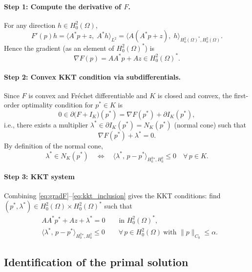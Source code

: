 \documentclass[11pt,a4paper]{article}
\begin{document}
\paragraph{Step 1: Compute the derivative of $F$.} 
For any direction $h\in H^2_0(\Omega)$,
\[
F'(p)h
=\langle A^*p+z,\;A^*h\rangle_{L^2}
=\langle A(A^*p+z),\;h\rangle_{H^2_0(\Omega)^*,H^2_0(\Omega)}.
\]
Hence the gradient (as an element of $H^2_0(\Omega)^*$) is
\begin{equation}\label{eq:gradF}
\nabla F(p)=AA^*p+Az \in H^2_0(\Omega)^*.
\end{equation}

\paragraph{Step 2: Convex KKT condition via subdifferentials.}
Since $F$ is convex and Fr\'echet differentiable and $K$ is closed and convex, the
first-order optimality condition for $p^*\in K$ is
\[
0\in \partial \bigl(F+I_K\bigr)(p^*)
=\nabla F(p^*)+\partial I_K(p^*),
\]
i.e., there exists a multiplier $\lambda^*\in \partial I_K(p^*)=N_K(p^*)$ (normal cone) such that
\begin{equation}\label{eq:kkt_inclusion}
\nabla F(p^*)+\lambda^*=0.
\end{equation}
By definition of the normal cone,
\[
\lambda^*\in N_K(p^*)
\quad\Longleftrightarrow\quad
\langle \lambda^*,\,p-p^*\rangle_{H^2_0{}^*,H^2_0}\le 0
\quad\forall\,p\in K .
\]

\paragraph{Step 3: KKT system}
Combining \eqref{eq:gradF}--\eqref{eq:kkt_inclusion} gives the KKT conditions:
find $(p^*,\lambda^*)\in H^2_0(\Omega)\times H^2_0(\Omega)^*$ such that
\begin{equation}\label{eq:KKT_predual}
\boxed{
\begin{aligned}
&AA^*p^*+Az+\lambda^*=0 \qquad\text{in }H^2_0(\Omega)^*,\\
&\langle \lambda^*,\,p-p^*\rangle_{H^2_0{}^*,H^2_0}\le 0
\qquad \forall\,p\in H^2_0(\Omega)\ \text{with }\|p\|_{C_0}\le \alpha.
\end{aligned}}
\end{equation}

\subsection{Identification of the primal solution}\label{subsec:lambda_equals_minus_u}
\end{document}
